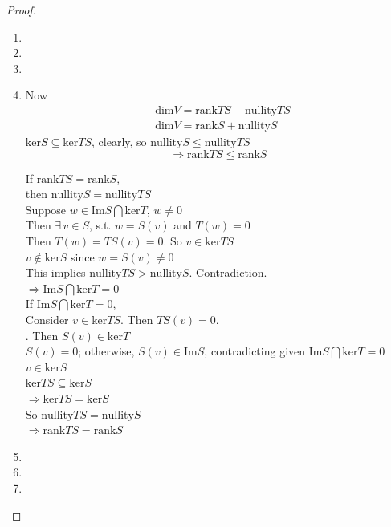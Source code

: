 \documentclass[11pt]{amsart}
\theoremstyle{definition}
\begin{document}
\begin{proof}
\begin{enumerate}
\item[(a)]
\item[(b)]
\item[(c)]
\item[(d)] Now
\[
\begin{aligned}
  & \text{dim}V = \text{rank}TS + \text{nullity}TS \\
  &  \text{dim}V = \text{rank}S + \text{nullity}S
\end{aligned}
\]
$\text{ker}S \subseteq \text{ker}TS$, clearly, so $\text{nullity}S \leq \text{nullity}TS$
\[
\Longrightarrow \boxed{ \text{rank}TS \leq \text{rank}S }
\]

If $\text{rank}TS = \text{rank}S$, \\
\phantom{ \quad } then $\text{nullity}S = \text{nullity}TS$ \\
\phantom{ \, } Suppose $w \in \text{Im}S \bigcap \text{ker}T$, $w \neq 0$ \\
\phantom{ \quad } Then $\exists \,  v\in S$, s.t. $w = S(v)$ and $T(w)=0$ \\
\phantom{ \quad \, } Then $T(w) = TS(v) =0$.  So $v\in \text{ker}TS$ \\
\phantom{ \quad \quad \, } $v\notin \text{ker}S$ since $w = S(v) \neq 0$ \\
\phantom{ \quad \quad \, } This implies $\text{nullity}TS > \text{nullity}S$.  Contradiction. \\
$\Longrightarrow \text{Im}S \bigcap \text{ker}T =0$ \\

If $\text{Im}S \bigcap \text{ker}T =0$, \\
\phantom{ \quad } Consider $v \in \text{ker}TS$.  Then $TS(v)=0$.  \\
.  Then $S(v)  \in \text{ker}T$ \\
\phantom{ \quad  } $S(v) =0$; otherwise, $S(v) \in \text{Im}S$, contradicting given $\text{Im}S \bigcap \text{ker}T =0$ \\
\phantom{ \quad \quad } $v\in \text{ker}S$ \\

$\text{ker}TS \subseteq \text{ker}S$\\
$\Longrightarrow \text{ker}TS = \text{ker}S$ \\
So $\text{nullity}TS = \text{nullity}S$  \\
$\Longrightarrow \text{rank}TS = \text{rank}S$

\item[(e)]
\item[(f)]
\item[(g)]
\end{enumerate}
\end{proof}
\end{document}
